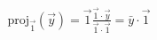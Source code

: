 \documentclass[preview]{standalone}
\begin{document}
\begin{align*}
\mathrm{proj}_{\overrightarrow{1}}(\overrightarrow{y}) = \overrightarrow{1} \frac{\overrightarrow{1} \cdot \overrightarrow{y}}{\overrightarrow{1} \cdot \overrightarrow{1}} = \bar{y} \cdot \overrightarrow{1}
\end{align*}
\end{document}

